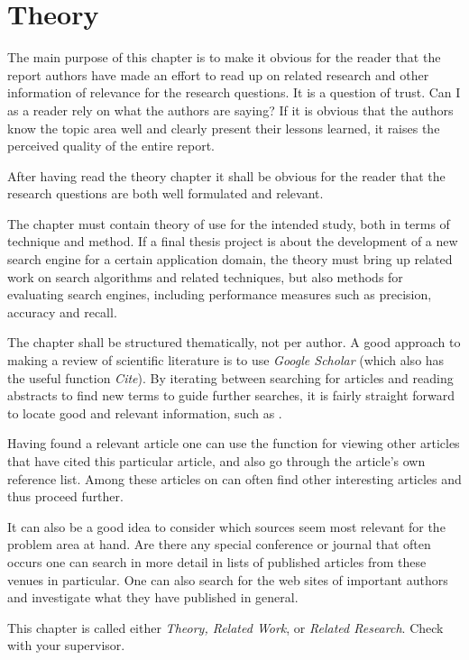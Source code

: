 \chapter{Theory}
\label{cha:theory}

The main purpose of this chapter is to make it obvious for
the reader that the report authors have made an effort to read
up on related research and other information of relevance for
the research questions. It is a question of trust. Can I as a
reader rely on what the authors are saying? If it is obvious
that the authors know the topic area well and clearly present
their lessons learned, it raises the perceived quality of the
entire report.

After having read the theory chapter it shall be obvious for
the reader that the research questions are both well
formulated and relevant.

The chapter must contain theory of use for the intended
study, both in terms of technique and method. If a final thesis
project is about the development of a new search engine for
a certain application domain, the theory must bring up related
work on search algorithms and related techniques, but also
methods for evaluating search engines, including
performance measures such as precision, accuracy and
recall.

The chapter shall be structured thematically, not per author.
A good approach to making a review of scientific literature
is to use \emph{Google Scholar} (which also has the useful function
\emph{Cite}). By iterating between searching for articles and reading
abstracts to find new terms to guide further searches, it is
fairly straight forward to locate good and relevant
information, such as \cite{test}.

Having found a relevant article one can use the function for
viewing other articles that have cited this particular article,
and also go through the article’s own reference list. Among
these articles on can often find other interesting articles and
thus proceed further.

It can also be a good idea to consider which sources seem
most relevant for the problem area at hand. Are there any
special conference or journal that often occurs one can search
in more detail in lists of published articles from these venues
in particular. One can also search for the web sites of
important authors and investigate what they have published
in general.

This chapter is called either \emph{Theory, Related Work}, or
\emph{Related Research}. Check with your supervisor.


